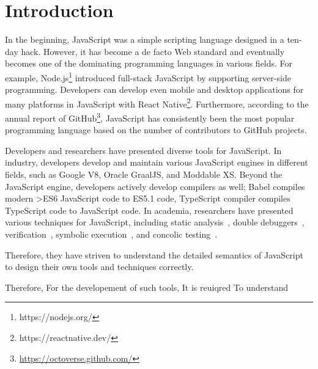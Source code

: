 \section{Introduction}\label{sec:intro}

In the beginning, JavaScript was a simple scripting language designed in a
ten-day hack. However, it has become a de facto Web standard and eventually
becomes one of the dominating programming languages in various fields. For
example, Node.js\footnote{https://nodejs.org/} introduced full-stack JavaScript
by supporting server-side programming.  Developers can develop even mobile and
desktop applications for many platforms in JavaScript with React
Native\footnote{https://reactnative.dev/}.  Furthermore, according to the annual
report of GitHub\footnote{\url{https://octoverse.github.com/}}, JavaScript has
consistently been the most popular programming language based on the number of
contributors to GitHub projects.

Developers and researchers have presented diverse tools for JavaScript.  In
industry, developers develop and maintain various JavaScript engines in
different fields, such as Google V8\cite{v8}, Oracle GraalJS\cite{graaljs}, and
Moddable XS\cite{xs}.  Beyond the JavaScript engine, developers actively develop
compilers as well; Babel\cite{babel} compiles modern >ES6 JavaScript code to
ES5.1 code, TypeScript compiler compiles TypeScript code to JavaScript code.  In
academia, researchers have presented various techniques for JavaScript,
including static analysis~\cite{safe, safe2, tajs, wala, jsai}, double
debuggers~\cite{jsexplain}, verification~\cite{javert, javert2, ad-safety,
javanni}, symbolic execution~\cite{symbolic-js, sym-js, expo-se}, and concolic
testing~\cite{jalangi, type-conc-test}.

Therefore, they have striven to understand the detailed semantics of JavaScript
to design their own tools and techniques correctly.

Therefore, 
For the developement of such tools, It is reuiqred 
To understand 

